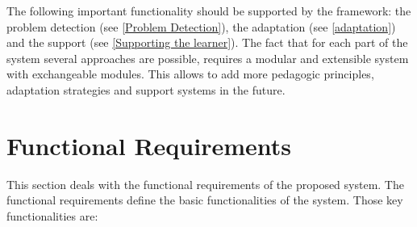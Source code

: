 The following important functionality should be supported by the framework: the problem detection (see \ref{Problem
Detection}), the adaptation (see \ref{adaptation}) and the support (see
\ref{Supporting the learner}). The fact that for each part of the system
several approaches are possible, requires a modular and extensible system with
exchangeable modules. This allows to add more pedagogic principles,
adaptation strategies and support systems in the future.





\section{Functional Requirements}
This section deals with the functional requirements of the proposed system.
The functional requirements define the basic functionalities of the system.
Those key functionalities are: 

